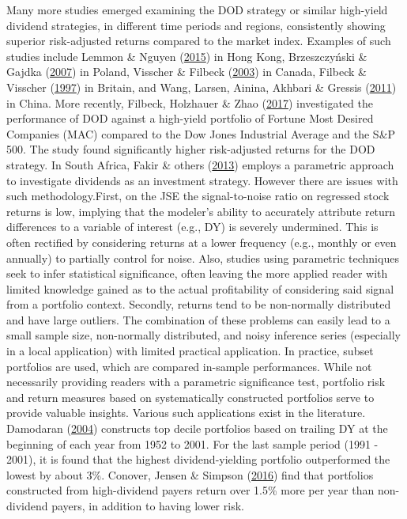 \documentclass[12pt,preprint, authoryear]{elsarticle}
\numberwithin{equation}{section}
\numberwithin{figure}{section}
\numberwithin{table}{section}
\begin{document}
Many more studies emerged examining the DOD strategy or similar
high-yield dividend strategies, in different time periods and regions,
consistently showing superior risk-adjusted returns compared to the
market index. Examples of such studies include Lemmon \& Nguyen
(\protect\hyperlink{ref-lemmon2015dividend}{2015}) in Hong Kong,
Brzeszczyński \& Gajdka
(\protect\hyperlink{ref-brzeszczynski2007dividend}{2007}) in Poland,
Visscher \& Filbeck (\protect\hyperlink{ref-visscher2003dividend}{2003})
in Canada, Filbeck \& Visscher
(\protect\hyperlink{ref-filbeck1997}{1997}) in Britain, and Wang,
Larsen, Ainina, Akhbari \& Gressis
(\protect\hyperlink{ref-wang2011dogs}{2011}) in China. More recently,
Filbeck, Holzhauer \& Zhao
(\protect\hyperlink{ref-filbeck2017dividend}{2017}) investigated the
performance of DOD against a high-yield portfolio of Fortune Most
Desired Companies (MAC) compared to the Dow Jones Industrial Average and
the S\&P 500. The study found significantly higher risk-adjusted returns
for the DOD strategy. In South Africa, Fakir \& others
(\protect\hyperlink{ref-fakir2013dividend}{2013}) employs a parametric
approach to investigate dividends as an investment strategy. However
there are issues with such methodology.First, on the JSE the
signal-to-noise ratio on regressed stock returns is low, implying that
the modeler's ability to accurately attribute return differences to a
variable of interest (e.g., DY) is severely undermined. This is often
rectified by considering returns at a lower frequency (e.g., monthly or
even annually) to partially control for noise. Also, studies using
parametric techniques seek to infer statistical significance, often
leaving the more applied reader with limited knowledge gained as to the
actual profitability of considering said signal from a portfolio
context. Secondly, returns tend to be non-normally distributed and have
large outliers. The combination of these problems can easily lead to a
small sample size, non-normally distributed, and noisy inference series
(especially in a local application) with limited practical application.
In practice, subset portfolios are used, which are compared in-sample
performances. While not necessarily providing readers with a parametric
significance test, portfolio risk and return measures based on
systematically constructed portfolios serve to provide valuable
insights. Various such applications exist in the literature. Damodaran
(\protect\hyperlink{ref-damodaran2004investment}{2004}) constructs top
decile portfolios based on trailing DY at the beginning of each year
from 1952 to 2001. For the last sample period (1991 - 2001), it is found
that the highest dividend-yielding portfolio outperformed the lowest by
about 3\%. Conover, Jensen \& Simpson
(\protect\hyperlink{ref-conover2016difference}{2016}) find that
portfolios constructed from high-dividend payers return over 1.5\% more
per year than non-dividend payers, in addition to having lower risk.
\end{document}
